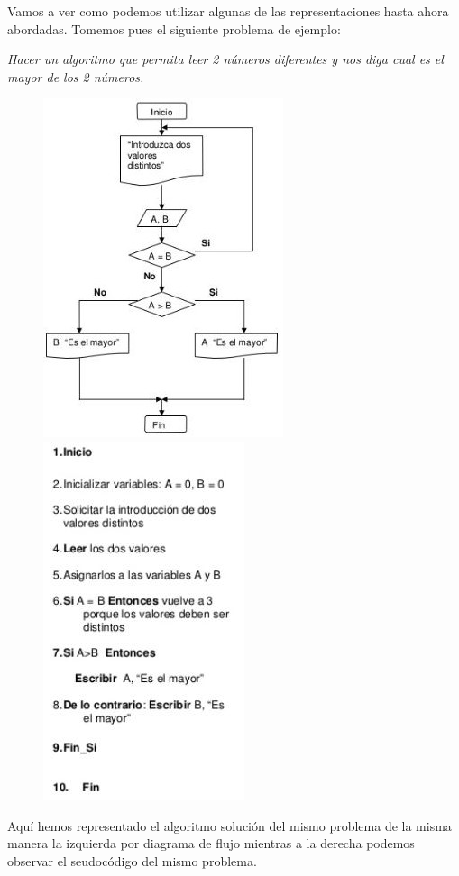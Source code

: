 Vamos a ver como podemos utilizar algunas de las representaciones hasta ahora abordadas. Tomemos pues el siguiente problema de ejemplo:

\emph{Hacer un algoritmo que permita leer 2 números diferentes y nos diga cual es el mayor de los 2 números.}

\begin{figure}[!h]
	\centering
	\includegraphics[width=0.35\linewidth]{img/ejemplo_diagrama-de_flujo_mayorymenor.jpg}
	\includegraphics[width=0.3\linewidth]{img/pseudocodigo.jpg}
	\label{fig:diagramaflujo}
\end{figure}

Aquí hemos representado el algoritmo solución del mismo problema de la misma manera la izquierda por diagrama de flujo mientras a la derecha podemos observar el seudocódigo del mismo problema.